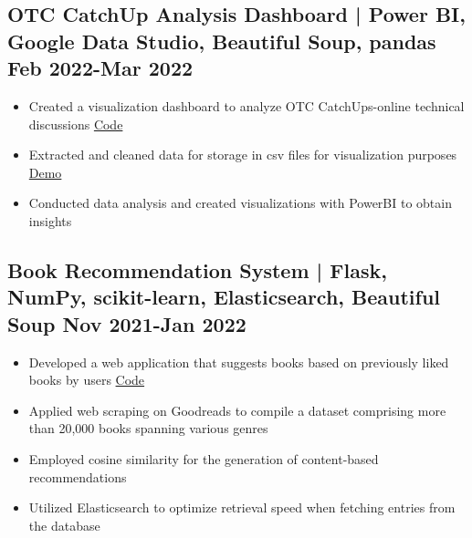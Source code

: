\documentclass[10pt]{article}
\newenvironment{zitemize}{
\begin{itemize}\itemsep2pt \parskip0pt \parsep1pt}
{\end{itemize}\vspace{-0.7cm}}
\begin{document}
\subsection*{OTC CatchUp Analysis Dashboard | \normalfont{} \normalsize Power BI, Google Data Studio, Beautiful Soup, pandas \hfill 
\textbf{Feb 2022-Mar 2022}}
    \begin{zitemize}
    \item Created a visualization dashboard to analyze OTC CatchUps-online technical discussions  \hfill \href{https://github.com/mihikagaonkar/OTC-Dashboard/}{Code}
     \item Extracted and cleaned data for storage in csv files for visualization purposes
     \hfill
     \href{https://mihikagaonkar.github.io/OTC-Dashboard/data_studio}{Demo}
        \item Conducted data analysis and created visualizations with PowerBI to obtain insights





    \end{zitemize}
        \vspace{0.1cm}
\subsection*{Book Recommendation System | \normalfont{} \normalsize Flask, NumPy, scikit-learn, Elasticsearch, Beautiful Soup  \hfill \textbf {Nov 2021-Jan 2022}
}
    \begin{zitemize}
    \item Developed a web application that suggests books based on previously liked books by users
 \hfill \href{https://github.com/mihikagaonkar/book-recommender-system}{Code}
     \item Applied web scraping on Goodreads to compile a dataset comprising more than 20,000 books spanning various genres
        \item Employed cosine similarity for the generation of content-based recommendations
        \item Utilized Elasticsearch to optimize retrieval speed when fetching entries from the database
    \end{zitemize}
        \vspace{0.1cm}
\end{document}
